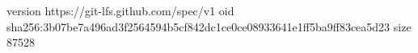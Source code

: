 version https://git-lfs.github.com/spec/v1
oid sha256:3b07be7a496ad3f2564594b5cf842dc1ce0ce08933641e1ff5ba9ff83cea5d23
size 87528
